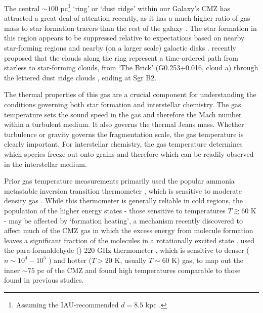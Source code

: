 The central $\sim100$ pc\footnote{Assuming the IAU-recommended $d=8.5$ kpc
\citep{Ghez2008a,Gillessen2009b,Reid2009a,Gillessen2013b}.} `ring' or `dust ridge'
\citep{Lis1994a,Sofue1995a,Molinari2011a} within our Galaxy's CMZ has attracted
a great deal of attention recently, as it has a much higher ratio of gas mass
to star formation tracers than the rest of the galaxy
\citep{Longmore2013a,Longmore2012b,Longmore2012a,Kruijssen2013a,Yusef-Zadeh2009a,Immer2012a}.
The star formation in this region appears to be suppressed relative to
expectations based on nearby star-forming regions and nearby (on a larger
scale) galactic disks
\citep{Kennicutt1998a,Kennicutt2012a,Leroy2013a,Heiderman2010a}.
\citet{Longmore2013a} recently proposed that the clouds along the ring
represent a time-ordered path from starless to star-forming clouds, from `The
Brick' (G0.253+0.016, cloud a) through the lettered dust ridge clouds
\citep[clouds b,c,d,e,f][]{Lis1999a}, ending at Sgr B2.

The thermal properties of this gas are a crucial component for understanding
the conditions governing both star formation and interstellar chemistry.  The
gas temperature sets the sound speed in the gas and therefore the Mach number
within a turbulent medium.  It also governs the thermal Jeans mass.  Whether
turbulence or gravity governs the fragmentation scale, the gas temperature is
clearly important.  For interstellar chemistry, the gas temperature determines
which species freeze out onto grains and therefore which can be readily
observed in the interstellar medium.

Prior gas temperature measurements primarily used the popular ammonia
metastable inversion transition thermometer \citep[\ammonia (1,1) -
(5,5);][]{Guesten1981a,Huettemeister1993a,Ott2014a}, which is sensitive to
moderate density gas \citep[$n(\hh) \sim 10^3-10^4$ \percc;][]{Shirley2015a}.
While this thermometer is generally reliable in cold regions, the population of
the higher energy states - those sensitive to temperatures $T\gtrsim60$ K - may
be affected by `formation heating', a mechanism recently discovered to affect
much of the CMZ gas in which the excess energy from molecule formation leaves a
significant fraction of the molecules in a rotationally excited state
\citep[][]{Mills2013a,Lis2014a}.  \citet{Ao2013a} used the para-formaldehyde
(\para) 220 GHz thermometer \citep{Mangum1993a}, which is sensitive to denser
($n\sim10^4-10^5$ \percc) and hotter ($T>20$ K, usually $T\sim60$ K) gas, to
map out the inner $\sim75$ pc of the CMZ and found high temperatures comparable
to those found in previous studies.

